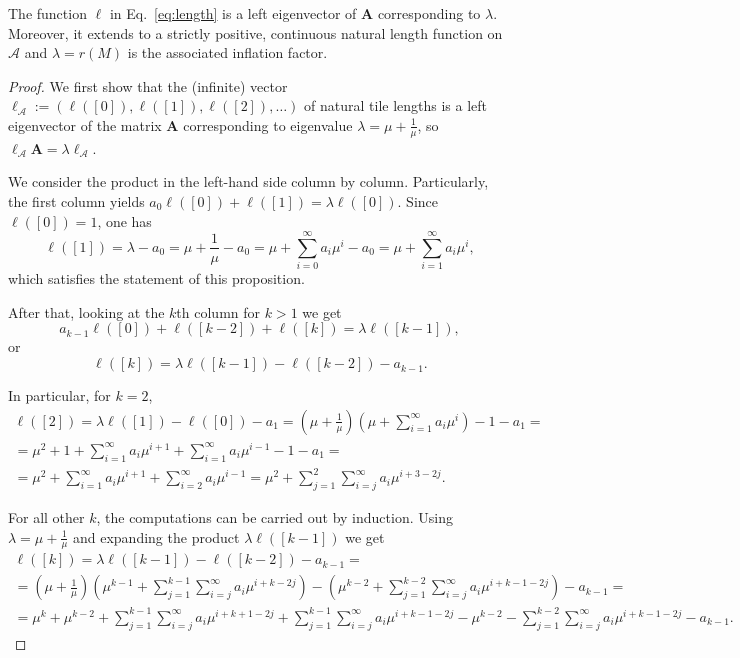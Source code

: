 \begin{prop}\label{prop:length}
The function $\ell$ in Eq.~\eqref{eq:length}
is a left eigenvector of $\mathbf{A}$ corresponding to $\lambda$. Moreover, it extends to a strictly positive, continuous natural length function on $\mathcal{A}$ and $\lambda=r(M)$ is the associated inflation factor. 
\end{prop}

\begin{proof}
We first show that the (infinite) vector $\ell_\mathcal A:=(\ell([0]),\ell([1]),\ell([2]),\ldots)$ of natural tile lengths is a left eigenvector of the matrix $\mathbf A$ corresponding to eigenvalue $\lambda=\mu+\frac{1}{\mu}$, so $\ell_\mathcal A\mathbf A=\lambda \ell_\mathcal A$.

We consider the product in the left-hand side column by column. Particularly, the first column yields 
$a_0\ell([0])+\ell([1])=\lambda \ell([0])$. Since $\ell([0])=1$, one has
$$\ell([1])=\lambda -a_0=\mu+\frac{1}{\mu}-a_0=\mu+\sum_{i=0}^\infty a_i\mu^i-a_0=\mu+\sum_{i=1}^\infty a_i\mu^i,$$
which satisfies the statement of this proposition.

After that, looking at the $k$th column for $k>1$ we get
$$a_{k-1}\ell([0])+\ell([k-2])+\ell([k])=\lambda \ell([k-1]),$$
or
$$\ell([k])=\lambda \ell([k-1])-\ell([k-2])-a_{k-1}.$$

In particular, for $k=2$,
\begin{multline*}\ell([2])=\lambda \ell([1])-\ell([0])-a_1=\left(\mu+\frac{1}{\mu}\right)\left( \mu+\sum_{i=1}^\infty a_i\mu^i\right)-1-a_1=\\
=\mu^2+1+\sum_{i=1}^\infty a_i\mu^{i+1}+\sum_{i=1}^\infty a_i\mu^{i-1}-1-a_1=\\=
\mu^2+\sum_{i=1}^\infty a_i\mu^{i+1}+\sum_{i=2}^\infty a_i\mu^{i-1}=\mu^2+\sum_{j=1}^2\sum_{i=j}^\infty a_i\mu^{i+3-2j}.
\end{multline*}

For all other $k$, the computations can be carried out by induction. Using $\lambda=\mu+\frac{1}{\mu}$ and expanding the product $\lambda\ell([k-1])$ we get
\begin{multline*}\ell([k])=\lambda \ell([k-1])-\ell([k-2])-a_{k-1}=\\=
\left(\mu+\frac{1}{\mu}\right)\left(\mu^{k-1}+\sum_{j=1}^{k-1}\sum_{i=j}^\infty a_i\mu^{i+k-2j}\right)-\left(\mu^{k-2}+\sum_{j=1}^{k-2}\sum_{i=j}^\infty a_i\mu^{i+k-1-2j}\right)-a_{k-1}=\\=
\mu^k+\mu^{k-2}+\sum_{j=1}^{k-1}\sum_{i=j}^\infty a_i\mu^{i+k+1-2j}+\sum_{j=1}^{k-1}\sum_{i=j}^\infty a_i\mu^{i+k-1-2j}-\mu^{k-2}-\sum_{j=1}^{k-2}\sum_{i=j}^\infty a_i\mu^{i+k-1-2j}-a_{k-1}.
\end{multline*}


\end{proof}
